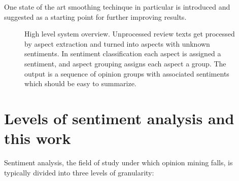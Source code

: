\documentclass[a4paper,11pt]{kth-mag}
\begin{document}
One state of the art smoothing techinque in particular is introduced and suggested as a starting point
for further improving results.

\begin{figure}[t]
  \centering
  \caption{High level system overview. Unprocessed review texts get processed by aspect extraction and turned into
    aspects with unknown sentiments. In sentiment classification each aspect is assigned a sentiment, and aspect grouping assigns each aspect a group. The output is a sequence of opinion groups with associated sentiments which should be easy to summarize.}
  \label{fig:overview}
\end{figure}


\clearpage

\newpage
\section{Levels of sentiment analysis and this work}
Sentiment analysis, the field of study under which opinion mining falls,
is typically divided into three levels of granularity:
\end{document}
